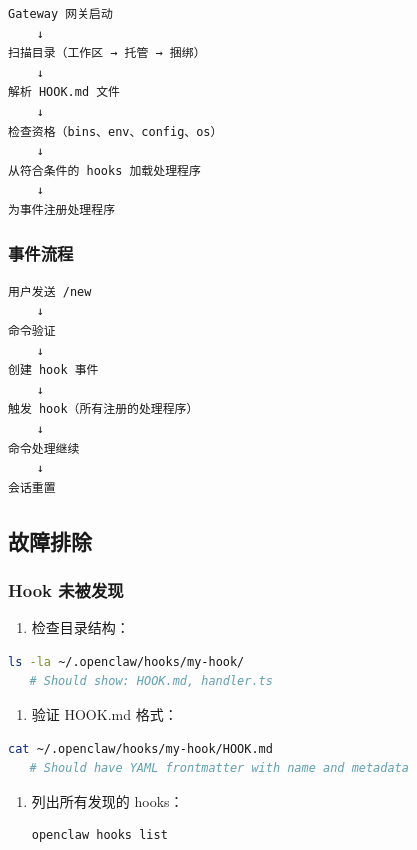 \begin{lstlisting}
Gateway 网关启动
    ↓
扫描目录（工作区 → 托管 → 捆绑）
    ↓
解析 HOOK.md 文件
    ↓
检查资格（bins、env、config、os）
    ↓
从符合条件的 hooks 加载处理程序
    ↓
为事件注册处理程序
\end{lstlisting}


\subsubsection{事件流程}


\begin{lstlisting}
用户发送 /new
    ↓
命令验证
    ↓
创建 hook 事件
    ↓
触发 hook（所有注册的处理程序）
    ↓
命令处理继续
    ↓
会话重置
\end{lstlisting}


\subsection{故障排除}


\subsubsection{Hook 未被发现}


\begin{enumerate}
  \item 检查目录结构：
\end{enumerate}


\begin{lstlisting}[language=bash]
   ls -la ~/.openclaw/hooks/my-hook/
   # Should show: HOOK.md, handler.ts
\end{lstlisting}


\begin{enumerate}
  \item 验证 HOOK.md 格式：
\end{enumerate}


\begin{lstlisting}[language=bash]
   cat ~/.openclaw/hooks/my-hook/HOOK.md
   # Should have YAML frontmatter with name and metadata
\end{lstlisting}


\begin{enumerate}
  \item 列出所有发现的 hooks：
\begin{lstlisting}[language=bash]
   openclaw hooks list
\end{lstlisting}

\end{enumerate}


